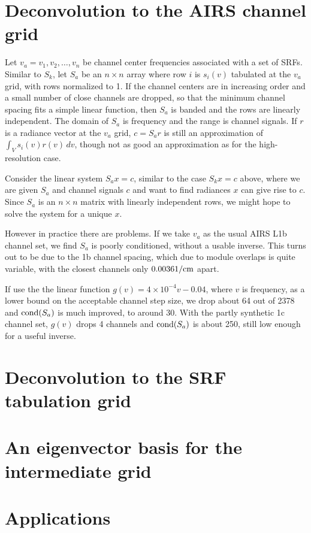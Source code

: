 \documentclass[11pt]{article}
\begin{document}
\section{Deconvolution to the AIRS channel grid}

Let $v_a = v_1,v_2,\ldots,v_n$ be channel center frequencies
associated with a set of SRFs.  Similar to $S_k$, let $S_a$ be an
$n\times n$ array where row $i$ is $s_i(v)$ tabulated at the $v_a$
grid, with rows normalized to 1.  If the channel centers are in
increasing order and a small number of close channels are dropped,
so that the minimum channel spacing fits a simple linear function,
then $S_a$ is banded and the rows are linearly independent.  
The domain of $S_a$ is frequency and the range is channel signals.
If $r$ is a radiance vector at the $v_a$ grid, $c = S_a r$ is still
an approximation of $\int_V s_i(v)r(v)\,dv$, though not as good an
approximation as for the high-resolution case.

Consider the linear system $S_a x = c$, similar to the case $S_k x =
c$ above, where we are given $S_a$ and channel signals $c$ and want
to find radiances $x$ can give rise to $c$.  Since $S_a$ is an $n
\times n$ matrix with linearly independent rows, we might hope to
solve the system for a unique $x$.

However in practice there are problems.  If we take $v_a$ as the
usual AIRS L1b channel set, we find $S_a$ is poorly conditioned,
without a usable inverse.  This turns out to be due to the 1b
channel spacing, which due to module overlaps is quite variable,
with the closest channels only $0.0036 1/\hbox{cm}$ apart.

If use the the linear function $g(v) = 4\times 10^{-4} v - 0.04$,
where $v$ is frequency, as a lower bound on the acceptable channel
step size, we drop about 64 out of 2378 and $\hbox{cond}(S_a)$ is
much improved, to around 30.  With the partly synthetic 1c channel
set, $g(v)$ drops 4 channels and $\hbox{cond}(S_a)$ is about 250,
still low enough for a useful inverse.

\section{Deconvolution to the SRF tabulation grid}

\section{An eigenvector basis for the intermediate grid}

\section{Applications}
\end{document}
